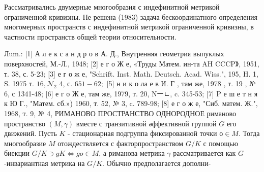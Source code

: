\documentclass[10pt]{article}
\begin{document}
Рассматривались двумерные многообразия с индефинитной метрикой ограниченной кривизны. Не решена (1983) задача бескоординатного определения многомерных пространств с индефинитной метрикой ограниченной кривизны, в частности пространств общей теории относительности.



Лum.: [1] А л е к с а н д р о в А. Д., Внутренняя геометрия выпуклых поверхностей, М.-Л., 1948; [2] е г о Ж е, «Труды Матем. ин-та AH CCCP》, 1951, т. 38, с. 5-23; [3] е г о ж е, "Schrift. Inst. Math. Deutsch. Acad. Wiss.", 195, H. 1, S. 1975 т. $16, \mathcal{N}_{2}$ 4, с. $651-62 ;$ [5] н и к о ла е в И. Г , там же, 1978 , т. 19 , № 6, с 1341-48; [6] е г о Ж е, там же, 1979, т. 20, Nㅡㄴ, c. 345-53; [7] P е ш е т н я к Ю Г., "Матем. сб.») 1960, т. 52, № 3, c. 789-98; [8] е г о ж е, "Сиб. матем. Ж.", 1968, т. 9, № 4, РИМАНОВО ПРОСТРАНСТВО ОДНОРОДНОЕ риманово пространство $(M, \gamma)$ вместе с транзитивной әффективной группой $G$ его движений. Пусть $K$ - стационарная подгруппа фиксированной точки $о \in M$. Тогда многообразие $M$ отождествляется с факторпространством $G / K$ с помощью биекции $G / K \ni g K \Longleftrightarrow g o \in M$, а риманова метрика $\gamma$ рассматривается как $G$-инвариантная метрика на $G / K$. Обычно предполагается дополни-
\end{document}
